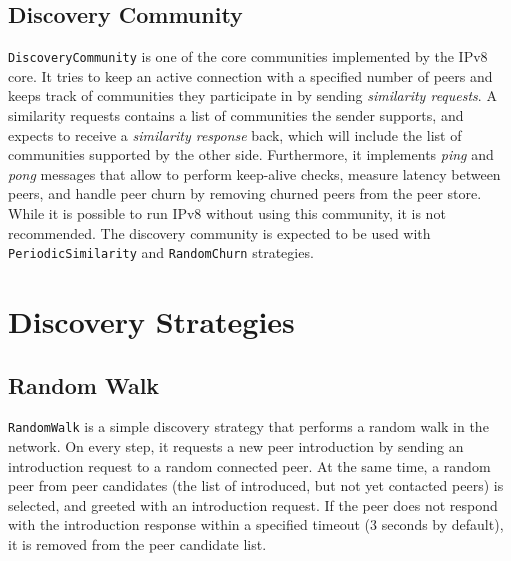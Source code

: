 \subsection{Discovery Community}

\texttt{DiscoveryCommunity} is one of the core communities implemented by the IPv8 core. It tries to keep an active connection with a specified number of peers and keeps track of communities they participate in by sending \textit{similarity requests}. A similarity requests contains a list of communities the sender supports, and expects to receive a \textit{similarity response} back, which will include the list of communities supported by the other side. Furthermore, it implements \textit{ping} and \textit{pong} messages that allow to perform keep-alive checks, measure latency between peers, and handle peer churn by removing churned peers from the peer store. While it is possible to run IPv8 without using this community, it is not recommended. The discovery community is expected to be used with \texttt{PeriodicSimilarity} and \texttt{RandomChurn} strategies.





\section{Discovery Strategies}

\subsection{Random Walk}

\texttt{RandomWalk} is a simple discovery strategy that performs a random walk in the network. On every step, it requests a new peer introduction by sending an introduction request to a random connected peer. At the same time, a random peer from peer candidates (the list of introduced, but not yet contacted peers) is selected, and greeted with an introduction request. If the peer does not respond with the introduction response within a specified timeout (3 seconds by default), it is removed from the peer candidate list.

